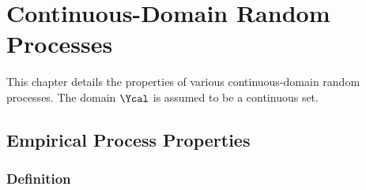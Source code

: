 \documentclass[12pt]{report}
\begin{document}







\chapter{Continuous-Domain Random Processes}

This chapter details the properties of various continuous-domain random processes. The domain $\Ycal$ is assumed to be a continuous set.


\section{Empirical Process Properties} \label{app:EP}


\subsection{Definition}
\end{document}
